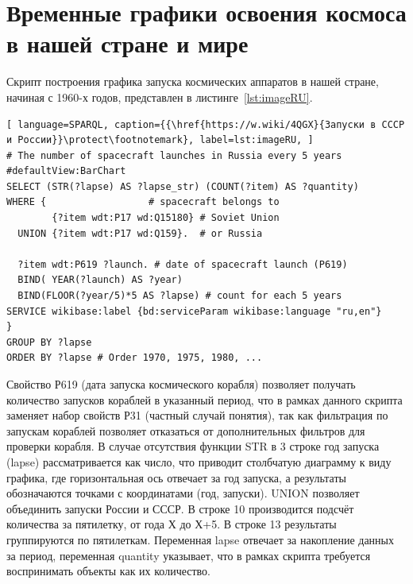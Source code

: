 \section{Временные графики освоения космоса в нашей стране и мире}
Скрипт построения графика запуска космических аппаратов в нашей стране, начиная с 1960-х годов, представлен в листинге~\ref{lst:imageRU}.
\begin{lstlisting}[ language=SPARQL, caption={{\href{https://w.wiki/4QGX}{Запуски в СССР и России}}\protect\footnotemark}, label=lst:imageRU, ]
# The number of spacecraft launches in Russia every 5 years
#defaultView:BarChart
SELECT (STR(?lapse) AS ?lapse_str) (COUNT(?item) AS ?quantity)
WHERE {                  # spacecraft belongs to
        {?item wdt:P17 wd:Q15180} # Soviet Union
  UNION {?item wdt:P17 wd:Q159}.  # or Russia
  
  ?item wdt:P619 ?launch. # date of spacecraft launch (P619)
  BIND( YEAR(?launch) AS ?year) 
  BIND(FLOOR(?year/5)*5 AS ?lapse) # count for each 5 years
SERVICE wikibase:label {bd:serviceParam wikibase:language "ru,en"}
} 
GROUP BY ?lapse
ORDER BY ?lapse # Order 1970, 1975, 1980, ...
\end{lstlisting}
Свойство Р619 (дата запуска космического корабля) позволяет получать количество запусков кораблей в указанный период, что в рамках данного скрипта заменяет набор свойств Р31 (частный случай понятия), так как фильтрация по запускам кораблей позволяет отказаться от дополнительных фильтров для проверки корабля. В случае отсутствия функции STR в 3 строке год запуска (lapse) рассматривается как число, что приводит столбчатую диаграмму к виду графика, где горизонтальная ось отвечает за год запуска, а результаты обозначаются точками с координатами (год, запуски). UNION позволяет объединить запуски России и СССР. В строке 10 производится подсчёт количества за пятилетку, от года Х до Х+5. В строке 13 результаты группируются по пятилеткам. Переменная lapse отвечает за накопление данных за период, переменная quantity указывает, что в рамках скрипта требуется воспринимать объекты как их количество.

